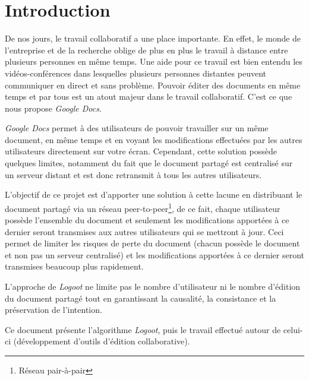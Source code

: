 \chapter*{Introduction}

De nos jours, le travail collaboratif a une place importante. En effet, le monde
de l'entreprise et de la recherche oblige de plus en plus le travail à distance
entre plusieurs personnes en même temps. Une aide pour ce travail est bien
entendu les vidéos-conférences dans lesquelles plusieurs personnes distantes
peuvent communiquer en direct et sans problème. Pouvoir éditer des documents en
même temps et par tous est un atout majeur dans le travail collaboratif. C'est
ce que nous propose \emph{Google Docs}.

\emph{Google Docs} permet à des utilisateurs de pouvoir travailler sur un même
document, en même temps et en voyant les modifications effectuées par les autres
utilisateurs directement sur votre écran. Cependant, cette solution possède
quelques limites, notamment du fait que le document partagé est centralisé sur
un serveur distant et est donc retransmit à tous les autres utilisateurs.

L'objectif de ce projet est d'apporter une solution à cette lacune en
distribuant le document partagé via un réseau peer-to-peer\footnote{Réseau
pair-à-pair}, de ce fait, chaque utilisateur possède l'ensemble du document et
seulement les modifications apportées à ce dernier seront transmises aux autres
utilisateurs qui se mettront à jour. Ceci permet de limiter les risques de perte
du document (chacun possède le document et non pas un serveur centralisé) et les
modifications apportées à ce dernier seront transmises beaucoup plus rapidement.

L'approche de \emph{Logoot} ne limite pas le nombre d'utilisateur ni le nombre
d'édition du document partagé tout en garantissant la causalité, la consistance
et la préservation de l'intention.

Ce document présente l'algorithme \emph{Logoot}, puis le travail effectué autour
de celui-ci (développement d'outils d'édition collaborative).

